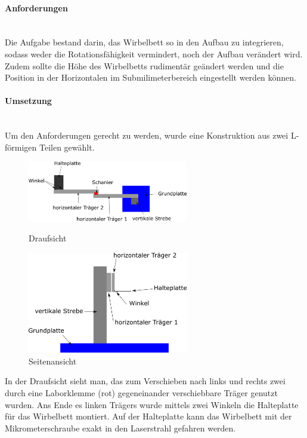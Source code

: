 \paragraph{Anforderungen}

\hfill \\
Die Aufgabe bestand darin, das Wirbelbett so in den Aufbau zu integrieren, sodass weder die Rotationsfähigkeit vermindert, noch der Aufbau verändert wird. Zudem sollte die Höhe des Wirbelbetts rudimentär geändert werden und die Position in der Horizontalen im Submilimeterbereich eingestellt werden können. 


\paragraph{Umsetzung}
\hfill \\
Um den Anforderungen gerecht zu werden, wurde eine Konstruktion aus zwei L-förmigen Teilen gewählt. 

\begin{figure}[h]
	\begin{minipage}[hbt]{7cm}
		\centering
		\includegraphics[width=7cm]{Halterung_Lichtstreu_Vogel.png}
		\caption{Draufsicht}
	\end{minipage}
	\hfill
	\begin{minipage}[hbt]{7cm}
		\centering
		\includegraphics[width=7cm]{Halterung_Lichtstreu_Seite.png}
		\caption{Seitenansicht}
	\end{minipage}
\end{figure}


In der Draufsicht sieht man, das zum Verschieben nach links und rechts zwei durch eine Laborklemme (rot) gegeneinander verschiebbare Träger genutzt wurden. Ans Ende es linken Trägers wurde mittels zwei Winkeln die Halteplatte für das Wirbelbett montiert. Auf der Halteplatte kann das Wirbelbett mit der Mikrometerschraube exakt in den Laserstrahl gefahren werden.





